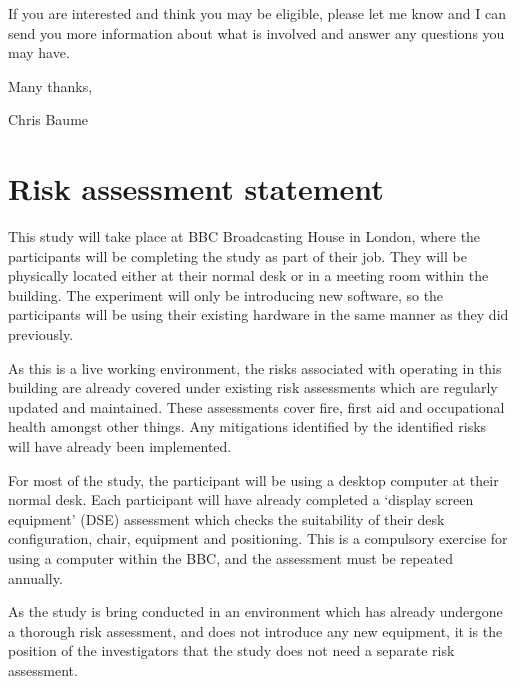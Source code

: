 If you are interested and think you may be eligible, please let me know and I
can send you more information about what is involved and answer any questions
you may have.

Many thanks,

Chris Baume

\section{Risk assessment statement}
This study will take place at BBC Broadcasting House in London, where the
participants will be completing the study as part of their job. They will be
physically located either at their normal desk or in a meeting room within the
building. The experiment will only be introducing new software, so the
participants will be using their existing hardware in the same manner as they
did previously.

As this is a live working environment, the risks associated with operating in
this building are already covered under existing risk assessments which are
regularly updated and maintained. These assessments cover fire, first aid and
occupational health amongst other things. Any mitigations identified by the
identified risks will have already been implemented.

For most of the study, the participant will be using a desktop computer at
their normal desk. Each participant will have already completed a ‘display
screen equipment’ (DSE) assessment which checks the suitability of their desk
configuration, chair, equipment and positioning. This is a compulsory exercise
for using a computer within the BBC, and the assessment must be repeated
annually.

As the study is bring conducted in an environment which has already undergone a
thorough risk assessment, and does not introduce any new equipment, it is the
position of the investigators that the study does not need a separate risk
assessment.
